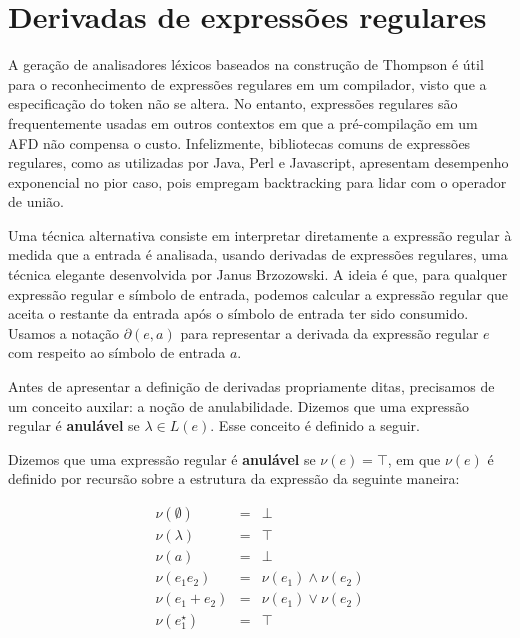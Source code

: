 \section{Derivadas de expressões regulares}

A geração de analisadores léxicos baseados na construção de Thompson
é útil para o reconhecimento de expressões regulares em um
compilador, visto que a especificação do token não se altera. No
entanto, expressões regulares são frequentemente usadas em outros
contextos em que a pré-compilação em um AFD não compensa o custo.
Infelizmente, bibliotecas comuns de expressões regulares, como as
utilizadas por Java, Perl e Javascript, apresentam desempenho
exponencial no pior caso, pois empregam backtracking para lidar com o
operador de união.

Uma técnica alternativa consiste em interpretar diretamente a
expressão regular à medida que a entrada é analisada, usando
derivadas de expressões regulares, uma técnica elegante desenvolvida
por Janus Brzozowski. A ideia é que, para qualquer expressão regular
e símbolo de entrada, podemos calcular a expressão regular que aceita
o restante da entrada após o símbolo de entrada ter sido consumido.
Usamos a notação \(\partial(e,a)\) para representar a derivada da
expressão regular \(e\) com respeito ao símbolo de entrada \(a\).

Antes de apresentar a definição de derivadas propriamente ditas,
precisamos de um conceito auxilar: a noção de anulabilidade. Dizemos
que uma expressão regular é \textbf{anulável} se \(\lambda \in
L(e)\). Esse conceito é definido a seguir.

\begin{Definition}
  Dizemos que uma expressão regular é \textbf{anulável}
  se \(\nu(e) = \top\), em que \(\nu(e)\) é definido por recursão
  sobre a estrutura da expressão da seguinte maneira:

  \[
    \begin{array}{lcl}
      \nu(\emptyset) & = & \bot\\
      \nu(\lambda)   & = & \top\\
      \nu(a)          & = & \bot\\
      \nu(e_1 e_2)    & = & \nu(e_1) \land \nu(e_2)\\
      \nu(e_1 + e_2)  & = & \nu(e_1) \lor \nu(e_2)\\
      \nu(e_1^\star) & = & \top\\
    \end{array}
  \]
\end{Definition}

